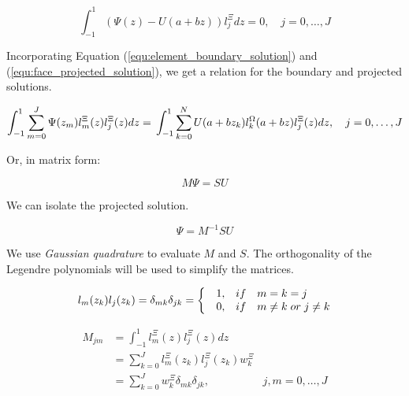 \begin{equation} \label{equ:zero_error}
	\int_{-1}^{1} \left( \Psi (z) - U(a + bz) \right) l_j^\Xi dz = 0, \quad j = 0, \ldots,J
\end{equation}

Incorporating Equation (\ref{equ:element_boundary_solution}) and (\ref{equ:face_projected_solution}),
we get a relation for the boundary and projected solutions.

\begin{equation} \label{equ:boundarry_and_projected}
	\int_{-1}^{1} \sum_{m = 0}^{J} \Psi (z_m) l_m^\Xi (z) l_j ^ \Xi(z) dz = \\
	\int_{-1}^{1} \sum_{k = 0}^{N} U(a + b z_k) l_k^\Omega (a + b z) l_j ^ \Xi (z) dz, \\ \quad
	j = 0, \ldots, J
\end{equation}

Or, in matrix form:

\begin{equation}
	M \Psi = S U
\end{equation}

We can isolate the projected solution.

\begin{equation}
	\Psi = M^{-1} S U
\end{equation}

We use \textit{Gaussian quadrature} to evaluate \(M\) and \(S\). The orthogonality of the Legendre
polynomials will be used to simplify the matrices.

\begin{equation} \label{equ:orthogonality_M}
	l_m (z_k) l_j (z_k) = \\
	\delta _{mk} \delta _{j k} = \left \{ \begin{matrix*}[l]
	& 1, & if & m = k = j \\ 
	& 0, & if & m \neq k \; or \; j \neq k
	\end{matrix*}\right.
\end{equation}

\begin{equation} \label{equ:matrix_M}
	\begin{aligned}
		M_{jm} &= \int_{-1}^{1} l_m ^ \Xi (z) l_j ^ \Xi (z) dz \\
		&= \sum_{k = 0}^{J} l_m ^ \Xi (z_k) l_j ^ \Xi (z_k)w_k ^ \Xi \\
		&= \sum_{k = 0}^{J} w_k ^ \Xi \delta_{mk}\delta_{jk}, & j, m = 0, \ldots, J
	\end{aligned}
\end{equation}

